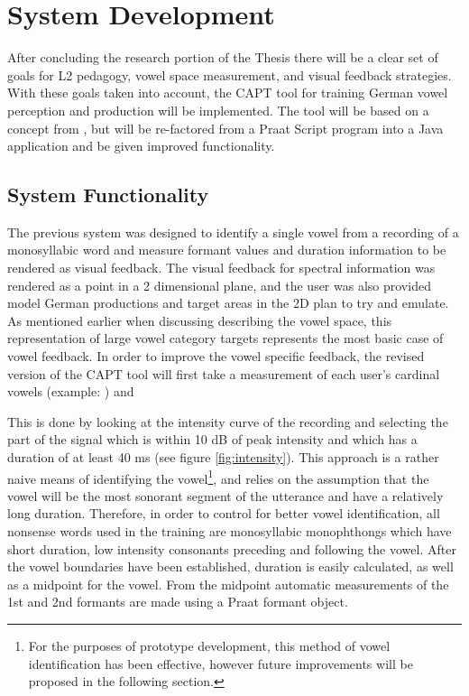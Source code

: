\section{System Development}

After concluding the research portion of the Thesis there will be a clear set of goals for L2 pedagogy, vowel space measurement, and visual feedback strategies. With these goals taken into account, the CAPT tool for training German vowel perception and production will be implemented. The tool will be based on a concept from \citep{Carroll2015}, but will be re-factored from a Praat Script program into a Java application and be given improved functionality. 

\subsection{System Functionality}
The previous system was designed to identify a single vowel from a recording of a monosyllabic word and measure formant values and duration information to be rendered as visual feedback. The visual feedback for spectral information was rendered as a point in a 2 dimensional plane, and the user was also provided model German productions and target areas in the 2D plan to try and emulate.  As mentioned earlier when discussing describing the vowel space, this representation of large vowel category targets represents the most basic case of vowel feedback.  In order to improve the vowel specific feedback, the revised version of the CAPT tool will first take a measurement of each user's  cardinal vowels (example: ) and 


This is done by looking at the intensity curve of the recording and selecting the part of the signal which is within 10 dB of peak intensity and which has a duration of at least 40 ms (see figure \ref{fig:intensity}). This approach is a rather naive means of identifying the vowel\footnote{For the purposes of prototype development, this method of vowel identification has been effective, however future improvements will be proposed in the following section.}, and relies on the assumption that the vowel will be the most sonorant segment of the utterance and have a relatively long duration. Therefore, in order to control for better vowel identification, all nonsense words used in the training are monosyllabic monophthongs which have short duration, low intensity consonants preceding and following the vowel. After the vowel boundaries have been established, duration is easily calculated, as well as a midpoint for the vowel. From the midpoint automatic measurements of the 1st and 2nd formants are made using a Praat formant object.

